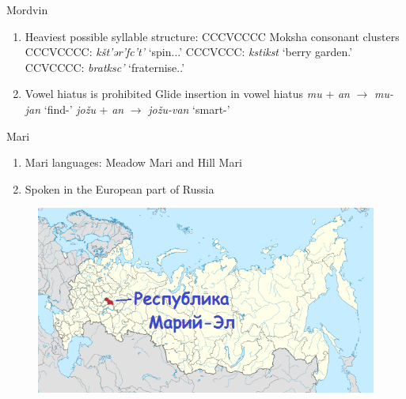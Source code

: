 \documentclass[10 pt, handout]{beamer}
\begin{document}
\begin{frame}{Mordvin}

	\begin{enumerate}[$\gg$]
		\item Heaviest possible syllable structure: CCCVCCCC
			\pex Moksha consonant clusters
				\a CCCVCCCC: \emph{kšt'ər'fc't'} \hfill `spin.{\Caus}.{\Pst}.{\Tpl}'
				\a CCCVCCC: \emph{kstikst} \hfill `berry garden.{\Pl}'
				\a CCVCCCC: \emph{bratksc'} \hfill `fraternise.{\Pst}.{\Tsg}'
			\xe
		\item Vowel hiatus is prohibited
			\pex Glide insertion in vowel hiatus
				\a \emph{mu} + \emph{an} $\rightarrow$ \emph{mu-jan} \hfill `find-{\Fsg}'
				\a \emph{jo\v{z}u} + \emph{an} $\rightarrow$ \emph{jo\v{z}u-van} \hfill `smart-{\Fsg}'
			\xe
	\end{enumerate}

\end{frame}

\begin{frame}{Mari}

	\begin{enumerate}[$\gg$]
		\item Mari languages: Meadow Mari and Hill Mari
		\item Spoken in the European part of Russia
	\end{enumerate}
	
	\begin{figure}[H]
		\centering
		\includegraphics[scale=.6]{mari-el-map}
	\end{figure}
	
\end{frame}
\end{document}
